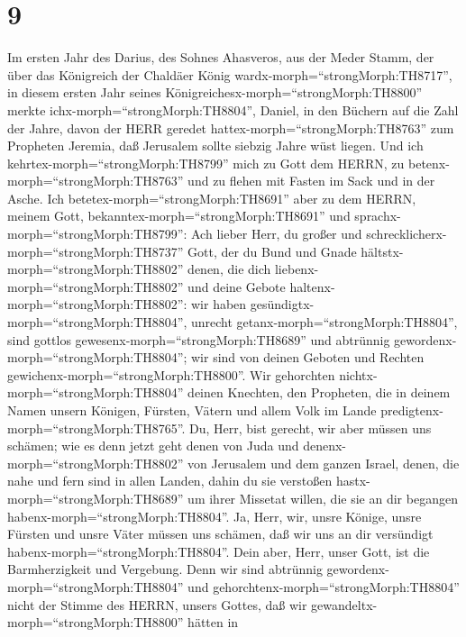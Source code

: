 \hypertarget{section-8}{%
\section{9}\label{section-8}}

 Im ersten Jahr des Darius, des Sohnes Ahasveros, aus der
Meder Stamm, der über das Königreich der Chaldäer König
wardx-morph=``strongMorph:TH8717'',  in diesem ersten Jahr
seines Königreichesx-morph=``strongMorph:TH8800'' merkte
ichx-morph=``strongMorph:TH8804'', Daniel, in den Büchern auf die Zahl
der Jahre, davon der HERR geredet hattex-morph=``strongMorph:TH8763''
zum Propheten Jeremia, daß Jerusalem sollte siebzig Jahre wüst liegen.
 Und ich kehrtex-morph=``strongMorph:TH8799'' mich zu Gott
dem HERRN, zu betenx-morph=``strongMorph:TH8763'' und zu flehen mit
Fasten im Sack und in der Asche.  Ich
betetex-morph=``strongMorph:TH8691'' aber zu dem HERRN, meinem Gott,
bekanntex-morph=``strongMorph:TH8691'' und
sprachx-morph=``strongMorph:TH8799'': Ach lieber Herr, du großer und
schrecklicherx-morph=``strongMorph:TH8737'' Gott, der du Bund und Gnade
hältstx-morph=``strongMorph:TH8802'' denen, die dich
liebenx-morph=``strongMorph:TH8802'' und deine Gebote
haltenx-morph=``strongMorph:TH8802'':  wir haben
gesündigtx-morph=``strongMorph:TH8804'', unrecht
getanx-morph=``strongMorph:TH8804'', sind gottlos
gewesenx-morph=``strongMorph:TH8689'' und abtrünnig
gewordenx-morph=``strongMorph:TH8804''; wir sind von deinen Geboten und
Rechten gewichenx-morph=``strongMorph:TH8800''.  Wir
gehorchten nichtx-morph=``strongMorph:TH8804'' deinen Knechten, den
Propheten, die in deinem Namen unsern Königen, Fürsten, Vätern und allem
Volk im Lande predigtenx-morph=``strongMorph:TH8765''.  Du,
Herr, bist gerecht, wir aber müssen uns schämen; wie es denn jetzt geht
denen von Juda und denenx-morph=``strongMorph:TH8802'' von Jerusalem und
dem ganzen Israel, denen, die nahe und fern sind in allen Landen, dahin
du sie verstoßen hastx-morph=``strongMorph:TH8689'' um ihrer Missetat
willen, die sie an dir begangen habenx-morph=``strongMorph:TH8804''.
 Ja, Herr, wir, unsre Könige, unsre Fürsten und unsre Väter
müssen uns schämen, daß wir uns an dir versündigt
habenx-morph=``strongMorph:TH8804''.  Dein aber, Herr, unser
Gott, ist die Barmherzigkeit und Vergebung. Denn wir sind abtrünnig
gewordenx-morph=``strongMorph:TH8804''  und
gehorchtenx-morph=``strongMorph:TH8804'' nicht der Stimme des HERRN,
unsers Gottes, daß wir gewandeltx-morph=``strongMorph:TH8800'' hätten in
